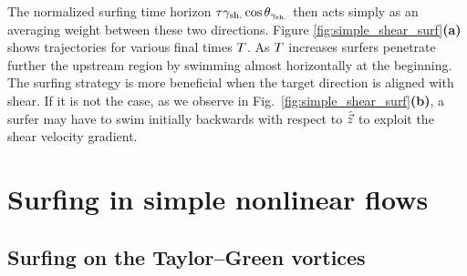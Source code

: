 The normalized surfing time horizon $\tau \gamma_{\mathrm{sh.}} \cos \theta_{\gamma_{\mathrm{sh.}}}$ then acts simply as an averaging weight between these two directions.
Figure \ref{fig:simple_shear_surf}\textbf{(a)}  shows trajectories for various final times $T$.
As $T$ increases surfers penetrate further the upstream region by swimming almost horizontally at the beginning.
The surfing strategy is more beneficial when the target direction is aligned with shear.
If it is not the case, as we observe in Fig.~\ref{fig:simple_shear_surf}\textbf{(b)}, a surfer may have to swim initially backwards with respect to $\hat{\vec{z}}$ to exploit the shear velocity gradient.

\section{Surfing in simple nonlinear flows}

\subsection{Surfing on the Taylor–Green vortices}\label{sec:the_surfing_strategy_taylor}

